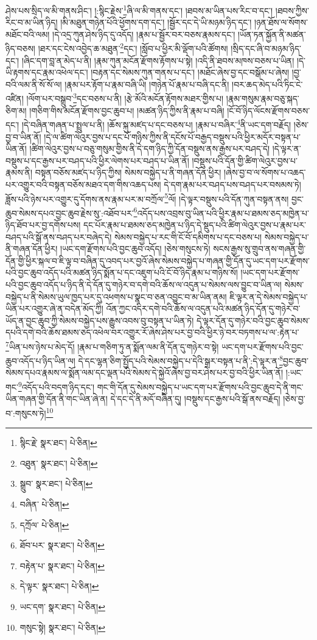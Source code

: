 ཤེས་པས་སྲིད་ལ་མི་གནས་ཤིང་། །:སྙིང་རྗེས་\footnote{སྙིང་རྗེ་  སྣར་ཐང་།  པེ་ཅིན། }ཞི་ལ་མི་གནས་དང་། །ཐབས་མ་ཡིན་པས་རིང་བ་དང་། །ཐབས་ཀྱིས་རིང་བ་མ་ཡིན་ཉིད། །མི་མཐུན་གཉེན་པོའི་ཕྱོགས་དག་དང་། །སྦྱོར་དང་དེ་ཡི་མཉམ་ཉིད་དང་། །ཉན་ཐོས་ལ་སོགས་མཐོང་བའི་ལམ། །དེ་འདྲ་ཀུན་ཤེས་ཉིད་དུ་འདོད། །རྣམ་པ་སྦྱོར་བར་བཅས་རྣམས་དང་། །ཡོན་ཏན་སྐྱོན་ནི་མཚན་ཉིད་བཅས། །ཐར་དང་ངེས་འབྱེད་ཆ་མཐུན་\footnote{འཐུན་  སྣར་ཐང་།  པེ་ཅིན། }དང་། །སློབ་པ་ཕྱིར་མི་ལྡོག་པའི་ཚོགས། །སྲིད་དང་ཞི་བ་མཉམ་ཉིད་དང་། །ཞིང་དག་བླ་ན་མེད་པ་ནི། །རྣམ་ཀུན་མངོན་རྫོགས་རྟོགས་པ་སྟེ། །འདི་ནི་ཐབས་མཁས་བཅས་པ་ཡིན། །དེ་ཡི་རྟགས་དང་རྣམ་འཕེལ་དང་། །བརྟན་དང་སེམས་ཀུན་གནས་པ་དང་། །མཐོང་ཞེས་བྱ་དང་བསྒོམ་པ་ཞེས། །བྱ་བའི་ལམ་ནི་སོ་སོ་ལ། །རྣམ་པར་རྟོག་པ་རྣམ་བཞི་ཡི། །གཉེན་པོ་རྣམ་པ་བཞི་དང་ནི། །བར་ཆད་མེད་པའི་ཏིང་ངེ་འཛིན། །ལོག་པར་བསྒྲུབ་\footnote{སྒྲུབ་  སྣར་ཐང་།  པེ་ཅིན། }དང་བཅས་པ་ནི། །རྩེ་མོའི་མངོན་རྟོགས་མཐར་གྱིས་པ། །རྣམ་གསུམ་རྣམ་བཅུ་སྐད་ཅིག་མ། །གཅིག་གིས་མངོན་རྫོགས་བྱང་ཆུབ་པ། །མཚན་ཉིད་ཀྱིས་ནི་རྣམ་པ་བཞི། །ངོ་བོ་ཉིད་ལོངས་རྫོགས་བཅས་དང་། །དེ་བཞིན་གཞན་པ་སྤྲུལ་པ་ནི། །ཆོས་སྐུ་མཛད་པ་དང་བཅས་པ། །རྣམ་པ་བཞིར་\footnote{བཞིན་  པེ་ཅིན། }ནི་ཡང་དག་བརྗོད། །ཅེས་བྱ་བ་ཡིན་ནོ། །དེ་ལ་ཚིག་ལེའུར་བྱས་པ་དང་པོ་གཉིས་ཀྱིས་ནི་དངོས་པོ་བརྒྱད་བསྡུས་པའི་ཕྱིར་མདོར་བསྟན་པ་ཡིན་ནོ། །ཚིག་ལེའུར་བྱས་པ་བཅུ་གསུམ་གྱིས་ནི་དེ་དག་ཉིད་ཀྱི་དོན་བསྡུས་ནས་རྒྱས་པར་བཤད་དེ། །དེ་ལྟར་ན་བསྡུས་པ་དང་རྒྱས་པར་བཤད་པའི་ཕྱིར་ལེགས་པར་བཤད་པ་ཡིན་ནོ། །བསྡུས་པའི་དོན་གྱི་ཚིག་ལེའུར་བྱས་པ་རྣམས་ནི། བསྟན་བཅོས་མཛད་པ་ཉིད་ཀྱིས། སེམས་བསྐྱེད་པ་ནི་གཞན་དོན་ཕྱིར། །ཞེས་བྱ་བ་ལ་སོགས་པ་འཆད་པར་འགྱུར་བའི་བསྟན་བཅོས་མཐའ་དག་གིས་འཆད་པས། དེ་དག་རྣམ་པར་བཤད་པས་བཤད་པར་བསམས་ཏེ། ཟློས་པའི་ཉེས་པར་འགྱུར་དུ་དོགས་ནས་རྣམ་པར་མ་བཀྲོལ་\footnote{དཀྲོལ་  པེ་ཅིན། }ལོ། །དེ་ལྟར་བསྡུས་པའི་དོན་ཀུན་བསྟན་ནས། བྱང་ཆུབ་སེམས་དཔའ་བྱང་ཆུབ་རྗེས་སུ་:འཐོབ་པར་\footnote{ཐོབ་པར་  སྣར་ཐང་།  པེ་ཅིན། }འདོད་པས་འབྲས་བུ་ཡིན་པའི་ཕྱིར་རྣམ་པ་ཐམས་ཅད་མཁྱེན་པ་ཉིད་ཐོབ་པར་བྱ་དགོས་པས། དང་པོར་རྣམ་པ་ཐམས་ཅད་མཁྱེན་པ་ཉིད་དེ་སྡུད་པའི་ཚིག་ལེའུར་བྱས་པ་རྣམ་པར་བཤད་པའི་སྒོ་ནས་བཤད་པར་བཞེད་དེ། སེམས་བསྐྱེད་པ་རང་གི་ངོ་བོ་དམིགས་པ་དང་བཅས་པ། སེམས་བསྐྱེད་པ་ནི་གཞན་དོན་ཕྱིར། །ཡང་དག་རྫོགས་པའི་བྱང་ཆུབ་འདོད། །ཅེས་གསུངས་ཏེ། སངས་རྒྱས་སུ་གྲུབ་ནས་གཞན་གྱི་དོན་གྱི་ཕྱིར་སྐལ་བ་ཇི་ལྟ་བ་བཞིན་དུ་འབད་པར་བྱའོ་ཞེས་སེམས་བསྐྱེད་པ་གཞན་གྱི་དོན་དུ་ཡང་དག་པར་རྫོགས་པའི་བྱང་ཆུབ་འདོད་པའི་མཚན་ཉིད་སྨོན་པ་དང་འཇུག་པའི་ངོ་བོ་ཉིད་རྣམ་པ་གཉིས་སོ། །ཡང་དག་པར་རྫོགས་པའི་བྱང་ཆུབ་འདོད་པ་ཉིད་ནི་དེ་དོན་དུ་གཉེར་བ་དགེ་བའི་ཆོས་ལ་འདུན་པ་སེམས་ལས་བྱུང་བ་ཡིན་ལ། སེམས་བསྐྱེད་པ་ནི་སེམས་ཡུལ་ཁྱད་པར་དུ་འཕགས་པ་སྣང་བ་ཅན་འབྱུང་བ་མ་ཡིན་ནམ། ཇི་ལྟར་ན་དེ་སེམས་བསྐྱེད་པ་ཡིན་པར་འགྱུར་ཞེ་ན་བདེན་མོད་ཀྱི། འོན་ཀྱང་འདིར་དགེ་བའི་ཆོས་ལ་འདུན་པའི་མཚན་ཉིད་དོན་དུ་གཉེར་བ་ཡོད་ན་བྱང་ཆུབ་ཀྱི་སེམས་བསྐྱེད་པས་རྒྱུས་འབས་བུ་བསྟན་པ་ཡིན་ཏེ། དེ་ལྟར་དོན་དུ་གཉེར་བའི་བྱང་ཆུབ་སེམས་དཔའི་དགེ་བའི་ཆོས་ཐམས་ཅད་འཕེལ་བར་འགྱུར་རོ་ཞེས་ཤེས་པར་བྱ་བའི་ཕྱིར་ཉེ་བར་བཏགས་པ་ལ་:རྟེན་པ་\footnote{བརྟེན་པ་  སྣར་ཐང་།  པེ་ཅིན། }ཡིན་པས་ཉེས་པ་མེད་དོ། །རྣམ་པ་གཅིག་ཏུ་ན་སྨོན་ལམ་ནི་དོན་དུ་གཉེར་བ་སྟེ། ཡང་དག་པར་རྫོགས་པའི་བྱང་ཆུབ་འདོད་པ་ཉིད་ཡིན་ལ། དེ་དང་ལྷན་ཅིག་སྤྱོད་པའི་སེམས་བསྐྱེད་པ་དེའི་སྒྲར་བསྟན་པ་ནི་:དེ་ལྟར་ན་\footnote{དེ་ལྟར་  སྣར་ཐང་།  པེ་ཅིན། }བྱང་ཆུབ་སེམས་དཔའ་རྣམས་ལ་སྨོན་ལམ་དང་ལྡན་པའི་སེམས་དེ་སྐྱེའོ་ཞེས་བྱ་བར་ཤེས་པར་བྱ་བའི་ཕྱིར་ཡིན་ནོ། །:ཡང་གང་\footnote{ཡང་དག་  སྣར་ཐང་།  པེ་ཅིན། }འདོད་པའི་བདག་ཉིད་དང་། གང་གི་དོན་དུ་སེམས་བསྐྱེད་པ་ཡང་དག་པར་རྫོགས་པའི་བྱང་ཆུབ་དེ་ནི་གང་ཡིན་གཞན་གྱི་དོན་ནི་གང་ཡིན་ཞེ་ན། དེ་དང་དེ་ནི་མདོ་བཞིན་དུ། །བསྡུས་དང་རྒྱས་པའི་སྒོ་ནས་བརྗོད། །ཅེས་བྱ་བ་:གསུངས་ཏེ།\footnote{གསུང་སྟེ།  སྣར་ཐང་།  པེ་ཅིན། } 